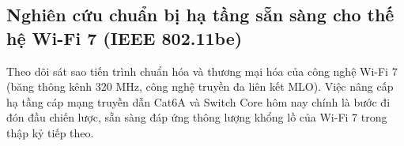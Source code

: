 \subsection{Nghiên cứu chuẩn bị hạ tầng sẵn sàng cho thế hệ Wi-Fi 7 (IEEE 802.11be)}
Theo dõi sát sao tiến trình chuẩn hóa và thương mại hóa của công nghệ Wi-Fi 7 (băng thông kênh 320 MHz, công nghệ truyền đa liên kết MLO). Việc nâng cấp hạ tầng cáp mạng truyền dẫn Cat6A và Switch Core hôm nay chính là bước đi đón đầu chiến lược, sẵn sàng đáp ứng thông lượng khổng lồ của Wi-Fi 7 trong thập kỷ tiếp theo.
